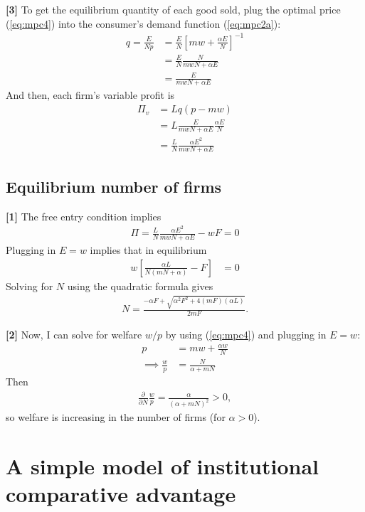 \documentclass[12pt]{article}
\begin{document}
\textbf{[3]} To get the equilibrium quantity of each good sold, plug the optimal price (\ref{eq:mpc4}) into the consumer's demand function (\ref{eq:mpc2a}):
\begin{align*}
q = \frac{E}{Np} &= \frac{E}{N}\left[  mw + \frac{\alpha E}{N}\right]^{-1}\\
&=\frac{E}{N} \frac{N}{mwN + \alpha E}\\
&= \frac{E}{mwN + \alpha E}
\end{align*}
And then, each firm's variable profit is
\begin{align}
\Pi_v &= Lq(p-mw) \nonumber\\
&= L\frac{E}{mwN + \alpha E}  \frac{\alpha E}{N} \nonumber\\
&=\frac{L}{N} \frac{\alpha E^2}{ mwN + \alpha E} \label{eq:mpc5}
\end{align}

\subsection{Equilibrium number of firms}
\textbf{[1]} The free entry condition implies
\begin{align*}
\Pi = \frac{L}{N} \frac{\alpha E^2}{ mwN + \alpha E}  - wF = 0
\end{align*}
Plugging in $E=w$ implies that in equilibrium 
\begin{align*}
w \left[ \frac{\alpha L}{N(mN+ \alpha)} - F\right] &= 0
\end{align*}
Solving for $N$ using the quadratic formula gives
\begin{align*}
N = \frac{-\alpha F + \sqrt{\alpha^2F^2 + 4(mF)(\alpha L)}}{2mF}.
\end{align*}

\textbf{[2]} Now, I can solve for welfare $w/p$ by using (\ref{eq:mpc4}) and plugging in $E=w$:
\begin{align*}
p &= mw + \frac{\alpha w}{N}\\
\implies \frac{w}{p} &=\frac{N}{\alpha + mN}
\end{align*}
Then
\begin{align*}
\frac{\partial}{\partial N} \frac{w}{p}  = \frac{\alpha}{(\alpha + mN)^2} >0 ,
\end{align*}
so welfare is increasing in the number of firms (for $\alpha > 0 $).



\newpage

\section{A simple model of institutional comparative advantage}
\end{document}

